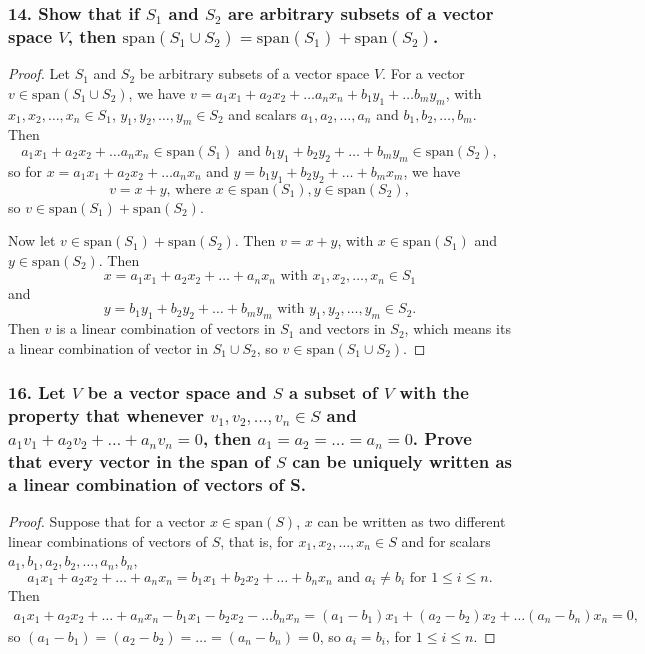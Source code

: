 \documentclass{article}
\begin{document}
\subsubsection*{14. Show that if $S_1$ and $S_2$ are arbitrary subsets of a vector space $V$, then $\text{span}(S_1 \cup S_2) = \text{span}(S_1) + \text{span}(S_2)$.}
\begin{proof}
	Let $S_1$ and $S_2$ be arbitrary subsets of a vector space $V$. For a vector $v \in \text{span}(S_1 \cup S_2)$, we have $v = a_1x_1 + a_2x_2 + \dots a_nx_n + b_1y_1 + \dots b_my_m$, with $x_1, x_2, \dots, x_n \in S_1$, $y_1, y_2, \dots, y_m \in S_2$ and scalars $a_1, a_2, \dots, a_n$ and $b_1, b_2, \dots, b_m$. Then \[a_1x_1 + a_2x_2 + \dots a_nx_n \in \text{span}(S_1)\text{ and }b_1y_1 + b_2y_2 + \dots + b_my_m \in \text{span}(S_2),\] so for $x = a_1x_1 + a_2x_2 + \dots a_nx_n$ and $y = b_1y_1 + b_2y_2 + \dots + b_mx_m$, we have \[ v = x + y\text{, where } x\in \text{span}(S_1), y\in \text{span}(S_2), \] so $v \in \text{span}(S_1) + \text{span}(S_2)$.
	
	Now let $v \in \text{span}(S_1) + \text{span}(S_2)$. Then $v = x + y$, with $x \in \text{span}(S_1)$ and $y \in \text{span}(S_2)$. Then \[x = a_1x_1 + a_2x_2 + \dots + a_nx_n \text{ with } x_1, x_2, \dots, x_n \in S_1 \] and \[y = b_1y_1 + b_2y_2 + \dots + b_my_m \text{ with } y_1, y_2, \dots, y_m \in S_2.\] Then $v$ is a linear combination of vectors in $S_1$ and vectors in $S_2$, which means its a linear combination of vector in $S_1 \cup S_2$, so $v \in \text{span}(S_1 \cup S_2)$.
\end{proof}

\subsubsection*{16. Let $V$ be a vector space and $S$ a subset of $V$ with the property that whenever $v_1, v_2, \dots, v_n \in S$ and $a_1v_1 + a_2v_2 + \dots + a_nv_n = 0$, then $a_1 = a_2 = \dots = a_n = 0$. Prove that every vector in the span of $S$ can be uniquely written as a linear combination of vectors of S.}
\begin{proof}
	Suppose that for a vector $x \in \text{span}(S)$, $x$ can be written as two different linear combinations of vectors of $S$, that is, for $x_1, x_2, \dots, x_n \in S$ and for scalars $a_1, b_1, a_2, b_2, \dots, a_n, b_n$, \[ a_1x_1 + a_2x_2 + \dots + a_nx_n = b_1x_1 + b_2x_2 + \dots + b_nx_n \text{ and } a_i \ne b_i \text{ for } 1 \le i \le n. \] Then
	\begin{align*}
		a_1x_1 + a_2x_2 + \dots + a_nx_n - b_1x_1 - b_2x_2 - \dots b_nx_n = (a_1 - b_1)x_1 + (a_2 - b_2)x_2 + \dots (a_n - b_n)x_n = 0,
	\end{align*}
	so $(a_1 - b_1) = (a_2 - b_2) = \dots = (a_n - b_n) = 0$, so $a_i = b_i$, for $1 \le i \le n$.
\end{proof}
\end{document}
